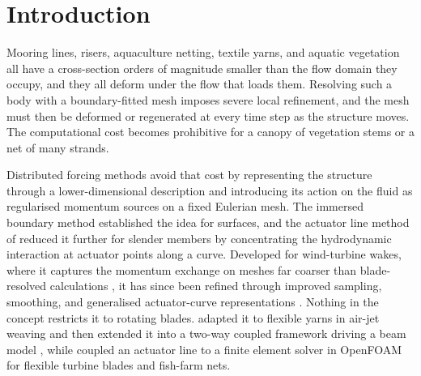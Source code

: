 \section{Introduction}
\label{sec:intro}

\noindent
Mooring lines, risers, aquaculture netting, textile yarns, and aquatic vegetation all have a cross-section orders of magnitude smaller than the flow domain they occupy, and they all deform under the flow that loads them. Resolving such a body with a boundary-fitted mesh imposes severe local refinement, and the mesh must then be deformed or regenerated at every time step as the structure moves. The computational cost becomes prohibitive for a canopy of vegetation stems or a net of many strands.

\noindent
Distributed forcing methods avoid that cost by representing the structure through a lower-dimensional description and introducing its action on the fluid as regularised momentum sources on a fixed Eulerian mesh. The immersed boundary method \citep{peskin_flow_1972,peskin_immersed_2002,mittal_immersed_2005,uhlmann_immersed_2005} established the idea for surfaces, and the actuator line method of \citet{sorensen_numerical_2002} reduced it further for slender members by concentrating the hydrodynamic interaction at actuator points along a curve. Developed for wind-turbine wakes, where it captures the momentum exchange on meshes far coarser than blade-resolved calculations \citep{troldborg_numerical_2010}, it has since been refined through improved sampling, smoothing, and generalised actuator-curve representations \citep{churchfield_advanced_2017,jha_actuator_2018,navarro_diaz_actuator_2023}. Nothing in the concept restricts it to rotating blades. \citet{bral_development_2025} adapted it to flexible yarns in air-jet weaving and then extended it into a two-way coupled framework driving a beam model \citep{bral_modeling_2025}, while \citet{schmitt_coupled_2022} coupled an actuator line to a finite element solver in OpenFOAM for flexible turbine blades and fish-farm nets.

